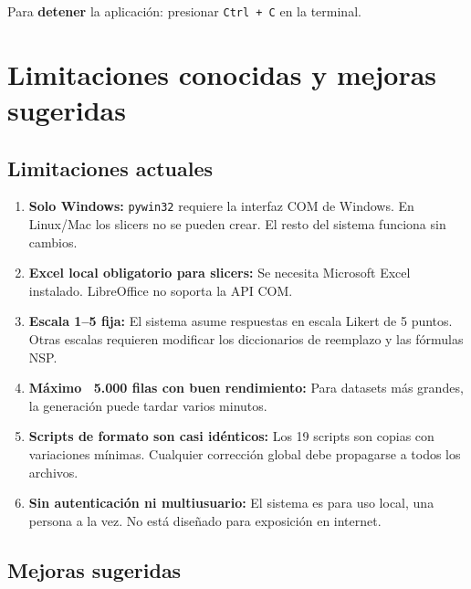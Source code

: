 \documentclass[12pt, letterpaper]{article}
\begin{document}
Para \textbf{detener} la aplicación: presionar \texttt{Ctrl + C} en la terminal.

\section{Limitaciones conocidas y mejoras sugeridas}

\subsection{Limitaciones actuales}

\begin{enumerate}[leftmargin=1.5cm, label=\textbf{\arabic*.}]
  \item \textbf{Solo Windows:} \texttt{pywin32} requiere la interfaz COM de Windows. En Linux/Mac los slicers no se pueden crear. El resto del sistema funciona sin cambios.
  \item \textbf{Excel local obligatorio para slicers:} Se necesita Microsoft Excel instalado. LibreOffice no soporta la API COM.
  \item \textbf{Escala 1--5 fija:} El sistema asume respuestas en escala Likert de 5 puntos. Otras escalas requieren modificar los diccionarios de reemplazo y las fórmulas NSP.
  \item \textbf{Máximo ~5.000 filas con buen rendimiento:} Para datasets más grandes, la generación puede tardar varios minutos.
  \item \textbf{Scripts de formato son casi idénticos:} Los 19 scripts son copias con variaciones mínimas. Cualquier corrección global debe propagarse a todos los archivos.
  \item \textbf{Sin autenticación ni multiusuario:} El sistema es para uso local, una persona a la vez. No está diseñado para exposición en internet.
\end{enumerate}

\subsection{Mejoras sugeridas}
\end{document}
